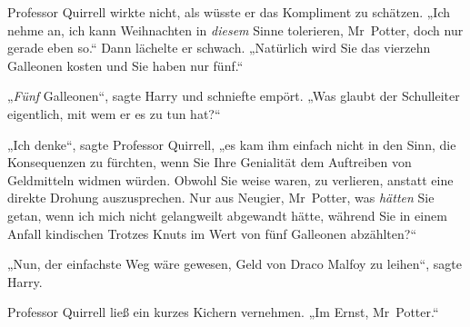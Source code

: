 Professor Quirrell wirkte nicht, als wüsste er das Kompliment zu schätzen.
„Ich nehme an, ich kann Weihnachten in \emph{diesem} Sinne tolerieren, Mr~Potter, doch nur gerade eben so.“ Dann lächelte er schwach.
„Natürlich wird Sie das vierzehn Galleonen kosten und Sie haben nur fünf.“

„\emph{Fünf} Galleonen“, sagte Harry und schniefte empört.
„Was glaubt der Schulleiter eigentlich, mit wem er es zu tun hat?“

„Ich denke“, sagte Professor Quirrell, „es kam ihm einfach nicht in den Sinn, die Konsequenzen zu fürchten, wenn Sie Ihre Genialität dem Auftreiben von Geldmitteln widmen würden. Obwohl Sie weise waren, zu verlieren, anstatt eine direkte Drohung auszusprechen. Nur aus Neugier, Mr~Potter, was \emph{hätten} Sie getan, wenn ich mich nicht gelangweilt abgewandt hätte, während Sie in einem Anfall kindischen Trotzes Knuts im Wert von fünf Galleonen abzählten?“

„Nun, der einfachste Weg wäre gewesen, Geld von Draco Malfoy zu leihen“, sagte Harry.

Professor Quirrell ließ ein kurzes Kichern vernehmen.
„Im Ernst, Mr~Potter.“


